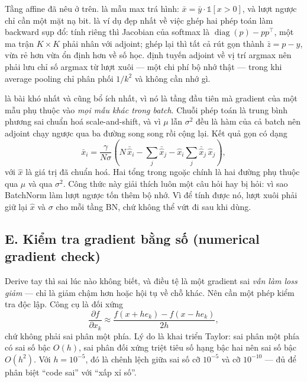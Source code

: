 \documentclass[../../../deep_learning.tex]{subfiles}
\begin{document}
Tầng affine đã nêu ở trên.  là mẫu max trá hình: \(\bar x = \bar y \cdot \mathbb{1}[x>0]\), và lượt ngược chỉ cần một mặt nạ bit.  là ví dụ đẹp nhất về việc ghép hai phép toán làm backward sụp đổ: tính riêng thì Jacobian của softmax là \(\operatorname{diag}(p) - pp^\top\), một ma trận \(K\times K\) phải nhân với adjoint; ghép lại thì tất cả rút gọn thành \(\bar z = p - y\), vừa rẻ hơn vừa ổn định hơn về số học.  định tuyến adjoint về vị trí argmax nên phải lưu chỉ số argmax từ lượt xuôi --- một chi phí bộ nhớ thật --- trong khi average pooling chỉ phân phối \(1/k^2\) và không cần nhớ gì.

 là bài khó nhất và cũng bổ ích nhất, vì nó là tầng đầu tiên mà gradient của một mẫu phụ thuộc vào \emph{mọi mẫu khác trong batch}. Chuỗi phép toán là trung bình \ra phương sai \ra chuẩn hoá \ra scale-and-shift, và vì \(\mu\) lẫn \(\sigma^2\) đều là hàm của cả batch nên adjoint chạy ngược qua ba đường song song rồi cộng lại. Kết quả gọn có dạng
\[
\bar x_i = \frac{\gamma}{N\sigma}\left(N\,\bar{\hat x}_i - \sum_j \bar{\hat x}_j - \hat x_i \sum_j \bar{\hat x}_j\,\hat x_j\right),
\]
với \(\hat x\) là giá trị đã chuẩn hoá. Hai tổng trong ngoặc chính là hai đường phụ thuộc qua \(\mu\) và qua \(\sigma^2\). Công thức này giải thích luôn một câu hỏi hay bị hỏi: vì sao BatchNorm làm lượt ngược tốn thêm bộ nhớ. Vì để tính được nó, lượt xuôi phải giữ lại \(\hat x\) và \(\sigma\) cho mỗi tầng BN, chứ không thể vứt đi sau khi dùng.

\subsection{E. Kiểm tra gradient bằng số (numerical gradient check)}
Derive tay thì sai lúc nào không biết, và điều tệ là một gradient sai \emph{vẫn làm loss giảm} --- chỉ là giảm chậm hơn hoặc hội tụ về chỗ khác. Nên cần một phép kiểm tra độc lập. Công cụ là  đối xứng
\[
\frac{\partial f}{\partial x_k} \approx \frac{f(x + h e_k) - f(x - h e_k)}{2h},
\]
chứ không phải sai phân một phía. Lý do là khai triển Taylor: sai phân một phía có sai số bậc \(O(h)\), sai phân đối xứng triệt tiêu số hạng bậc hai nên sai số bậc \(O(h^2)\). Với \(h = 10^{-5}\), đó là chênh lệch giữa sai số cỡ \(10^{-5}\) và cỡ \(10^{-10}\) --- đủ để phân biệt ``code sai'' với ``xấp xỉ số''.
\end{document}
